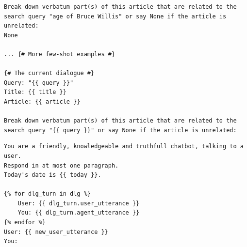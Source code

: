\begin{table}
\begin{lstlisting}[basicstyle=\ttfamily\small]
Break down verbatum part(s) of this article that are related to the search query "age of Bruce Willis" or say None if the article is unrelated:
None

... {# More few-shot examples #}

{# The current dialogue #}
Query: "{{ query }}"
Title: {{ title }}
Article: {{ article }}

Break down verbatum part(s) of this article that are related to the search query "{{ query }}" or say None if the article is unrelated:
\end{lstlisting}
\caption{Summarize and filter prompt of \system (Stage 2). This prompt has 7 few-shot examples.}
\label{prompt:summarization}
\end{table}

\begin{table}
\begin{lstlisting}[basicstyle=\ttfamily\small]
You are a friendly, knowledgeable and truthfull chatbot, talking to a user.
Respond in at most one paragraph.
Today's date is {{ today }}.

{% for dlg_turn in dlg %}
    User: {{ dlg_turn.user_utterance }}
    You: {{ dlg_turn.agent_utterance }}
{% endfor %}
User: {{ new_user_utterance }}
You:
\end{lstlisting}
\caption{The prompt for baseline chatbots, also used for Stage 3 of \system. This prompt is zero-shot.}
\label{prompt:baseline}
\end{table}


